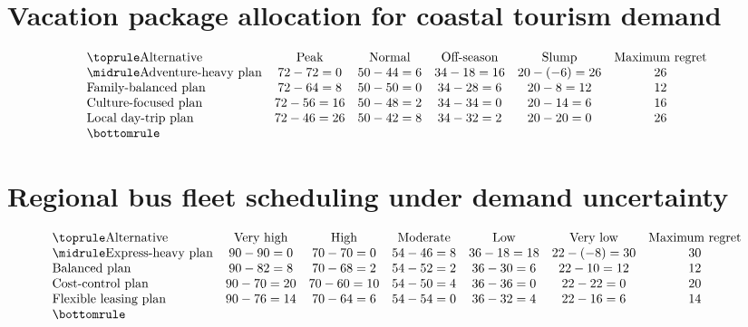 \section*{Vacation package allocation for coastal tourism demand}
\[\begin{array}{lccccc}
			\toprule
			\text{Alternative} & \text{Peak} & \text{Normal} & \text{Off-season} & \text{Slump} & \text{Maximum regret}\\
			\midrule
			\text{Adventure-heavy plan} & 72-72=0 & 50-44=6 & 34-18=16 & 20-(-6)=26 & 26\\
			\text{Family-balanced plan} & 72-64=8 & 50-50=0 & 34-28=6 & 20-8=12 & 12\\
			\text{Culture-focused plan} & 72-56=16 & 50-48=2 & 34-34=0 & 20-14=6 & 16\\
			\text{Local day-trip plan} & 72-46=26 & 50-42=8 & 34-32=2 & 20-20=0 & 26\\
			\bottomrule
		\end{array}\]

\section*{Regional bus fleet scheduling under demand uncertainty}
\[\begin{array}{lcccccc}
			\toprule
			\text{Alternative} & \text{Very high} & \text{High} & \text{Moderate} & \text{Low} & \text{Very low} & \text{Maximum regret}\\
			\midrule
			\text{Express-heavy plan} & 90-90=0 & 70-70=0 & 54-46=8 & 36-18=18 & 22-(-8)=30 & 30\\
			\text{Balanced plan} & 90-82=8 & 70-68=2 & 54-52=2 & 36-30=6 & 22-10=12 & 12\\
			\text{Cost-control plan} & 90-70=20 & 70-60=10 & 54-50=4 & 36-36=0 & 22-22=0 & 20\\
			\text{Flexible leasing plan} & 90-76=14 & 70-64=6 & 54-54=0 & 36-32=4 & 22-16=6 & 14\\
			\bottomrule
		\end{array}\]


